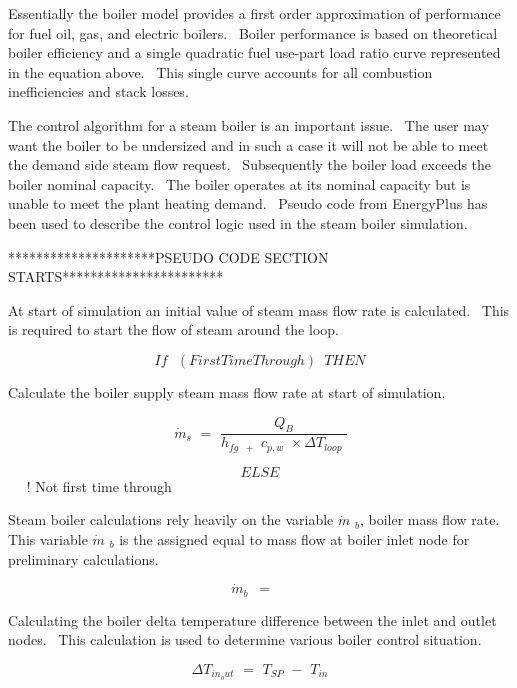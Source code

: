 Essentially the boiler model provides a first order approximation of performance for fuel oil, gas, and electric boilers.~ Boiler performance is based on theoretical boiler efficiency and a single quadratic fuel use-part load ratio curve represented in the equation above.~ This single curve accounts for all combustion inefficiencies and stack losses.

The control algorithm for a steam boiler is an important issue.~ The user may want the boiler to be undersized and in such a case it will not be able to meet the demand side steam flow request.~ Subsequently the boiler load exceeds the boiler nominal capacity.~ The boiler operates at its nominal capacity but is unable to meet the plant heating demand.~ Pseudo code from EnergyPlus has been used to describe the control logic used in the steam boiler simulation.

*********************PSEUDO CODE SECTION STARTS***********************

At start of simulation an initial value of steam mass flow rate is calculated.~ This is required to start the flow of steam around the loop.

\begin{equation}
If\,\,\,\,(FirstTimeThrough)\,\,\,THEN
\end{equation}

Calculate the boiler supply steam mass flow rate at start of simulation.

\begin{equation}
\,{\dot m_s}\,\, = \,\,\frac{{{Q_B}}}{{{h_{fg\,\,\, + }}\,\,{c_{p,w}}\,\, \times \Delta {T_{loop}}\,\,}}
\end{equation}

\[ELSE\] ~~ ! Not first time through

Steam boiler calculations rely heavily on the variable \(\dot m\) \(_{b}\), boiler mass flow rate.~ This variable \(\dot m\) \(_{b}\) is the assigned equal to mass flow at boiler inlet node for preliminary calculations.

\begin{equation}
\,{\dot m_b}\,\,\, = \,\,\,\mathop {\,{{\dot m}_{Inlet_Node}}}\limits^{}
\end{equation}

Calculating the boiler delta temperature difference between the inlet and outlet nodes.~ This calculation is used to determine various boiler control situation.

\begin{equation}
\Delta {T_{in_out}}\,\, = \,\,{T_{SP}}\,\, - \,\,{T_{in}}
\end{equation}

